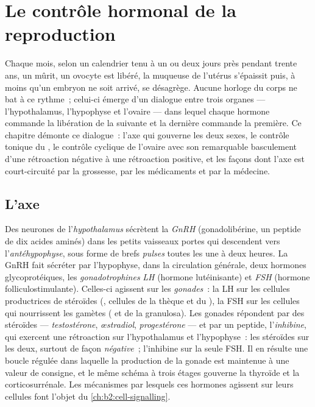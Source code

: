 \chapter{Le contrôle hormonal de la reproduction}\label{ch:b2:reproductive-hormones}

Chaque mois, selon un calendrier tenu à un ou deux jours près pendant
trente ans, un  mûrit, un ovocyte est libéré, la muqueuse de
l'utérus s'épaissit puis, à moins qu'un embryon ne soit arrivé, se
désagrège. Aucune horloge du corps ne bat à ce rythme~; celui-ci émerge
d'un dialogue entre trois organes --- l'hypothalamus, l'hypophyse et
l'ovaire --- dans lequel chaque hormone commande la libération de la
suivante et la dernière commande la première. Ce chapitre démonte ce
dialogue~: l'axe qui gouverne les deux sexes, le contrôle tonique du
, le contrôle cyclique de l'ovaire avec son remarquable
basculement d'une rétroaction négative à une rétroaction positive, et
les façons dont l'axe est court-circuité par la grossesse, par les
médicaments et par la médecine.

\section{L'axe}

\begin{definition}\label{def:b2:reproductive-hormones:axis}
Des neurones de l'\emph{hypothalamus} sécrètent la \emph{GnRH}
(gonadolibérine, un peptide de dix acides aminés) dans les petits
vaisseaux portes qui descendent vers l'\emph{antéhypophyse}, sous forme
de brefs \emph{pulses} toutes les une à deux heures. La GnRH fait
sécréter par l'hypophyse, dans la circulation générale, deux hormones
glycoprotéiques, les \emph{gonadotrophines} \emph{LH} (hormone
lutéinisante) et \emph{FSH} (hormone folliculostimulante). Celles-ci
agissent sur les \emph{gonades}~: la LH sur les cellules productrices de
stéroïdes (, cellules de la thèque et du ),
la FSH sur les cellules qui nourrissent les gamètes (
et de la granulosa). Les gonades répondent par des stéroïdes ---
\emph{testostérone}, \emph{œstradiol}, \emph{progestérone} --- et par
un peptide, l'\emph{inhibine}, qui exercent une rétroaction sur
l'hypothalamus et l'hypophyse~: les stéroïdes sur les deux, surtout de
façon \emph{négative}~; l'inhibine sur la seule FSH. Il en résulte une
boucle régulée dans laquelle la production de la gonade est maintenue à
une valeur de consigne, et le même schéma à trois étages gouverne la
thyroïde et la corticosurrénale. Les mécanismes par lesquels ces
hormones agissent sur leurs cellules font l'objet du
\cref{ch:b2:cell-signalling}.
\end{definition}

